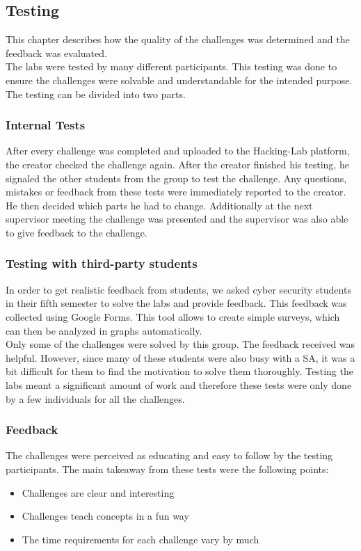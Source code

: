 \label{sec:testing}
\subsection{Testing}
This chapter describes how the quality of the challenges was determined and the feedback was evaluated. \\
The labs were tested by many different participants. This testing was done to ensure the challenges were solvable and understandable for the intended purpose. The testing can be divided into two parts.

\subsubsection{Internal Tests}
After every challenge was completed and uploaded to the Hacking-Lab platform, the creator checked the challenge again. After the creator finished his testing, he signaled the other students from the group to test the challenge. Any questions, mistakes or feedback from these tests were immediately reported to the creator. He then decided which parts he had to change. Additionally at the next supervisor meeting the challenge was presented and the supervisor was also able to give feedback to the challenge.

\subsubsection{Testing with third-party students}
In order to get realistic feedback from students, we asked cyber security students in their fifth semester to solve the labs and provide feedback. This feedback was collected using Google Forms. This tool allows to create simple surveys, which can then be analyzed in graphs automatically. \\
Only some of the challenges were solved by this group. The feedback received was helpful. However, since many of these students were also busy with a SA, it was a bit difficult for them to find the motivation to solve them thoroughly. Testing the labs meant a significant amount of work and therefore these tests were only done by a few individuals for all the challenges.

\subsubsection{Feedback}
The challenges were perceived as educating and easy to follow by the testing participants. The main takeaway from these tests were the following points:
\begin{itemize}
    \item Challenges are clear and interesting
    \item Challenges teach concepts in a fun way
    \item The time requirements for each challenge vary by much
  \end{itemize}

